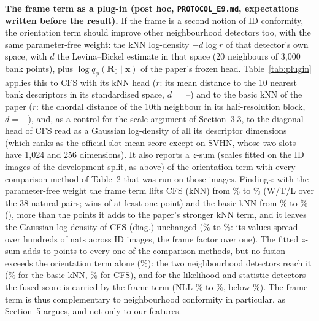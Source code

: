 \documentclass[10pt]{article}
\newcommand{\Rot}[1]{\mathbf{R}_{#1}}
\begin{document}
\textbf{The frame term as a plug-in (post hoc, \texttt{PROTOCOL\_E9.md}, expectations written before the result).} If the frame is a second notion of ID conformity, the orientation term should improve other neighbourhood detectors too, with the same parameter-free weight: the kNN log-density $-d\log r$ of that detector's own space, with $d$ the Levina--Bickel estimate in that space (20 neighbours of 3{,}000 bank points), plus $\log q_\phi(\Rot{0}\mid\mathbf{x})$ of the paper's frozen head. Table~\ref{tab:plugin} applies this to CFS with its kNN head ($r$: its mean distance to the 10 nearest bank descriptors in its standardised space, $d=$ \eNineDcfsMin--\eNineDcfsMax) and to the basic kNN of the paper ($r$: the chordal distance of the 10th neighbour in its half-resolution block, $d=$ \eNineDlMin--\eNineDlMax), and, as a control for the scale argument of Section~3.3, to the diagonal head of CFS read as a Gaussian log-density of all its descriptor dimensions (which ranks as the official slot-mean score except on SVHN, whose two slots have 1{,}024 and 256 dimensions). It also reports a $z$-sum (scales fitted on the ID images of the development split, as above) of the orientation term with every comparison method of Table~2 that was run on those images. Findings: with the parameter-free weight the frame term lifts CFS (kNN) from \eNineCfsKnn\% to \eNineUpCfsKnn\% (W/T/L \eNineCfsKnnWtl{} over the 38 natural pairs; \eNineCfsKnnBigWin{} wins of at least one point) and the basic kNN from \eNineKnnB\% to \eNineUpKnnB\% (\eNineKnnBWtl), more than the \eNineGainKnnT{} points it adds to the paper's stronger kNN term, and it leaves the Gaussian log-density of CFS (diag.) unchanged (\eNineCfsDiagG\% to \eNineUpCfsDiag\%: its values spread over hundreds of nats across ID images, the frame factor over one). The fitted $z$-sum adds \eNineZgainMin{} to \eNineZgainMax{} points to every one of the \eNineZn{} comparison methods, but no fusion exceeds the orientation term alone (\eNineOrient\%): the two neighbourhood detectors reach it (\eNineZKnnB\% for the basic kNN, \eNineZCfsKnn\% for CFS), and for the likelihood and statistic detectors the fused score is carried by the frame term (NLL \eNineNll\% to \eNineZNll\%, below \eNineOrient\%). The frame term is thus complementary to neighbourhood conformity in particular, as Section~5 argues, and not only to our features.
\end{document}
